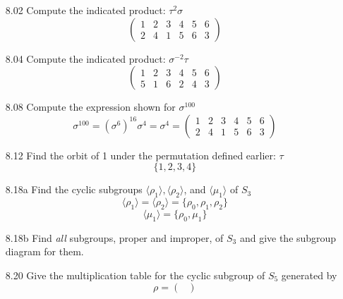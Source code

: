 \documentclass[12pt]{article}
\begin{document}
\begin{enumerate}
	\item[8.02] Compute the indicated product: $ \tau^2\sigma $
		\[\begin{pmatrix}
		1 & 2 & 3 & 4 & 5 & 6 \\
		2 & 4 & 1 & 5 & 6 & 3 
		\end{pmatrix}  \]
	\item[8.04] Compute the indicated product: $ \sigma^{-2}\tau $ 
			\[\begin{pmatrix}
			1 & 2 & 3 & 4 & 5 & 6 \\
			5 & 1 & 6 & 2 & 4 & 3 
			\end{pmatrix}  \]
	\item[8.08] Compute the expression shown for $ \sigma^{100} $
			\[\sigma^{100}=(\sigma^6)^{16}\sigma^4=\sigma^4 =
			\begin{pmatrix}
			1 & 2 & 3 & 4 & 5 & 6 \\
			2 & 4 & 1 & 5 & 6 & 3 
			\end{pmatrix}  \]
	\item[8.12] Find the orbit of 1 under the permutation defined earlier: $ \tau $
		\[\{1,2,3,4\}\]
	\item[8.18a] Find the cyclic subgroups $ \langle \rho_1\rangle, \langle \rho_2\rangle $, and  $\langle \mu_1\rangle $  of $ S_3 $
		\[\langle \rho_1 \rangle = \langle \rho_2 \rangle = \{\rho_0,\rho_1,\rho_2\}\] \[\langle \mu_1 \rangle = \{\rho_0,\mu_1\} \]
	\item[8.18b] Find \textit{all} subgroups, proper and improper, of $ S_3 $ and give the subgroup diagram for them.
	\item[8.20] Give the multiplication table for the cyclic subgroup of $ S_5 $ generated by 
		\[\rho = \begin{pmatrix}

\end{pmatrix}\]
\end{enumerate}
\end{document}
